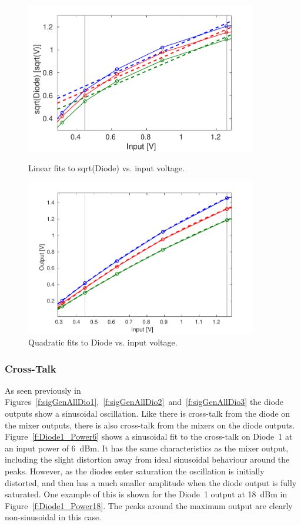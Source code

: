 \begin{figure}
  \centering
  \includegraphics[width=0.9\textwidth]{Figures/phaseMons/LinFitSqrtDiodeVsVolts}
  \caption{Linear fits to sqrt(Diode) vs. input voltage.}
  \label{f:LinFitSqrtDiodeVsVolts}
  \centering
  \includegraphics[width=0.9\textwidth]{Figures/phaseMons/QuadFitDiodeVsVolts}
  \caption{Quadratic fits to Diode vs. input voltage.}
  \label{f:QuadFitDiodeVsVolts}
\end{figure}

\subsubsection{Cross-Talk}

As seen previously in Figures~\ref{f:sigGenAllDio1},~\ref{f:sigGenAllDio2}~and~\ref{f:sigGenAllDio3} the diode outputs show a sinusoidal oscillation. Like there is cross-talk from the diode on the mixer outputs, there is also cross-talk from the mixers on the diode outputs. Figure~\ref{f:Diode1_Power6} shows a sinusoidal fit to the cross-talk on Diode~1 at an input power of 6~dBm. It has the same characteristics as the mixer output, including the slight distortion away from ideal sinusoidal behaviour around the peaks. However, as the diodes enter saturation the oscillation is initially distorted, and then has a much smaller amplitude when the diode output is fully saturated. One example of this is shown for the Diode~1 output at 18~dBm in Figure~\ref{f:Diode1_Power18}. The peaks around the maximum output are clearly non-sinusoidal in this case.

